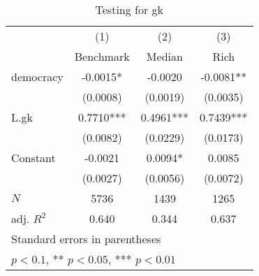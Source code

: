 \begin{table}[htbp]\centering
\def\sym#1{\ifmmode^{#1}\else\(^{#1}\)\fi}
\caption{Testing for gk \label{tab:regression5}}
\begin{tabular}{l*{3}{c}}
\hline\hline
            &\multicolumn{1}{c}{(1)}&\multicolumn{1}{c}{(2)}&\multicolumn{1}{c}{(3)}\\
            &\multicolumn{1}{c}{Benchmark}&\multicolumn{1}{c}{Median}&\multicolumn{1}{c}{Rich}\\
\hline
democracy   &     -0.0015*  &     -0.0020   &     -0.0081** \\
            &    (0.0008)   &    (0.0019)   &    (0.0035)   \\
[1em]
L.gk        &      0.7710***&      0.4961***&      0.7439***\\
            &    (0.0082)   &    (0.0229)   &    (0.0173)   \\
[1em]
Constant    &     -0.0021   &      0.0094*  &      0.0085   \\
            &    (0.0027)   &    (0.0056)   &    (0.0072)   \\
\hline
\(N\)       &        5736   &        1439   &        1265   \\
adj. \(R^{2}\)&       0.640   &       0.344   &       0.637   \\
\hline\hline
\multicolumn{4}{l}{\footnotesize Standard errors in parentheses}\\
\multicolumn{4}{l}{\footnotesize * \(p<0.1\), ** \(p<0.05\), *** \(p<0.01\)}\\
\end{tabular}
\end{table}
